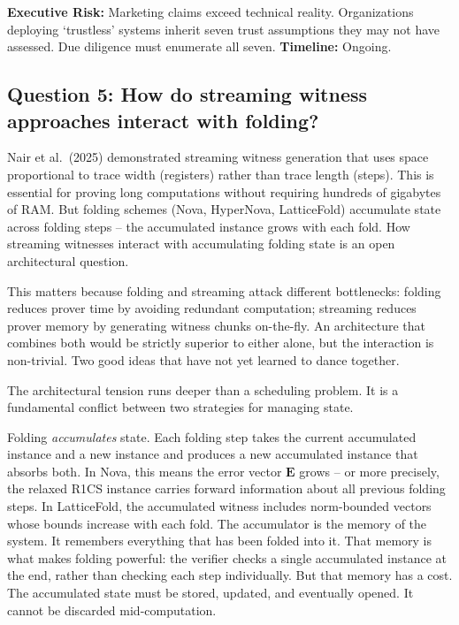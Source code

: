 \documentclass[
  11pt,
  openany]{report}
\renewcommand{\textbf}[1]{{\bfseries\color{MidnightBold}#1}}
\begin{document}
\textbf{Executive Risk:} Marketing claims exceed technical reality.
Organizations deploying `trustless' systems inherit seven trust assumptions they
may not have assessed. Due diligence must enumerate all seven.
\textbf{Timeline:} Ongoing.

\subsection{Question 5: How do streaming witness approaches interact with
folding?}\label{question-5-how-do-streaming-witness-approaches-interact-with-folding}

Nair et al.~(2025) demonstrated streaming witness generation that uses space
proportional to trace width (registers) rather than trace length (steps). This
is essential for proving long computations without requiring hundreds of
gigabytes of RAM. But folding schemes (Nova, HyperNova, LatticeFold) accumulate
state across folding steps -- the accumulated instance grows with each fold. How
streaming witnesses interact with accumulating folding state is an open
architectural question.

This matters because folding and streaming attack different bottlenecks: folding
reduces prover time by avoiding redundant computation; streaming reduces prover
memory by generating witness chunks on-the-fly. An architecture that combines
both would be strictly superior to either alone, but the interaction is
non-trivial. Two good ideas that have not yet learned to dance together.

The architectural tension runs deeper than a scheduling problem. It is a
fundamental conflict between two strategies for managing state.

Folding \emph{accumulates} state. Each folding step takes the current
accumulated instance and a new instance and produces a new accumulated instance
that absorbs both. In Nova, this means the error vector \(\mathbf{E}\) grows --
or more precisely, the relaxed R1CS instance carries forward information about
all previous folding steps. In LatticeFold, the accumulated witness includes
norm-bounded vectors whose bounds increase with each fold. The accumulator is
the memory of the system. It remembers everything that has been folded into it.
That memory is what makes folding powerful: the verifier checks a single
accumulated instance at the end, rather than checking each step individually.
But that memory has a cost. The accumulated state must be stored, updated, and
eventually opened. It cannot be discarded mid-computation.
\end{document}
